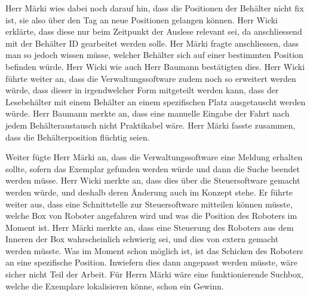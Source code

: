 \documentclass[parskip=full, a4paper]{scrreprt}
\begin{document}
Herr Märki wies dabei noch darauf hin, dass die Positionen der Behälter nicht fix ist, sie also über den Tag an neue Positionen gelangen können. Herr Wicki erklärte, dass diese nur beim Zeitpunkt der Auslese relevant sei, da anschliessend mit der Behälter ID gearbeitet werden solle.
Her Märki fragte anschliessen, dass man so jedoch wissen müsse, welcher Behälter sich auf einer bestimmten Position befinden würde. Herr Wicki wie auch Herr Baumann bestätigten dies.
Herr Wicki führte weiter an, dass die Verwaltungssoftware zudem noch so erweitert werden würde, dass dieser in irgendwelcher Form mitgeteilt werden kann, dass der Lesebehälter mit einem Behälter an einem spezifischen Platz ausgetauscht werden würde. Herr Baumann merkte an, dass eine manuelle Eingabe der Fahrt nach jedem Behälteraustausch nicht Praktikabel wäre. Herr Märki fasste zusammen, dass die Behälterposition flüchtig seien.

Weiter fügte Herr Märki an, dass die Verwaltungssoftware eine Meldung erhalten sollte, sofern das Exemplar gefunden werden würde und dann die Suche beendet werden müsse. Herr Wicki merkte an, dass dies über die Steuersoftware gemacht werden würde, und deshalb deren Änderung auch im Konzept stehe. Er führte weiter aus, dass eine Schnittstelle zur Steuersoftware mitteilen können müsste, welche Box von Roboter angefahren wird und was die Position des Roboters im Moment ist. Herr Märki merkte an, dass eine Steuerung des Roboters aus dem Inneren der Box wahrscheinlich schwierig sei, und dies von extern gemacht werden müsste. Was im Moment schon möglich ist, ist das Schicken des Roboters an eine spezifische Position. Inwiefern dies dann angepasst werden müsste, wäre sicher nicht Teil der Arbeit. Für Herrn Märki wäre eine funktionierende Suchbox, welche die Exemplare lokalisieren könne, schon ein Gewinn.
\end{document}
